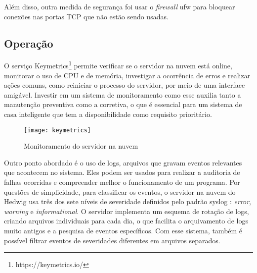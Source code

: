 Além disso, outra medida de segurança foi usar o \emph{firewall} ufw para bloquear conexões nas portas TCP que não estão sendo usadas.

\subsection{Operação}

O serviço Keymetrics\footnote{https://keymetrics.io/} permite verificar se o servidor na nuvem está online, monitorar o uso de CPU e de memória, investigar a ocorrência de erros e realizar ações comuns, como reiniciar o processo do servidor, por meio de uma interface amigável. Investir em um sistema de monitoramento como esse auxilia tanto a manutenção preventiva como a corretiva, o que é essencial para um sistema de casa inteligente que tem a disponibilidade como requisito prioritário.

\begin{figure}[H]
	\centering
	\caption{Monitoramento do servidor na nuvem}
  \texttt{[image: keymetrics]}
\label{fig:keymetrics}
\end{figure}

Outro ponto abordado é o uso de logs, arquivos que gravam eventos relevantes que acontecem no sistema. Eles podem ser usados para realizar a auditoria de falhas ocorridas e compreender melhor o funcionamento de um programa. Por questões de simplicidade, para classificar os eventos, o servidor na nuvem do Hedwig usa três dos sete níveis de severidade definidos pelo padrão syslog \cite{rfc5424}: \emph{error}, \emph{warning} e \emph{informational}. O servidor implementa um esquema de rotação de logs, criando arquivos individuais para cada dia, o que facilita o arquivamento de logs muito antigos e a pesquisa de eventos específicos. Com esse sistema, também é possível filtrar eventos de severidades diferentes em arquivos separados.
